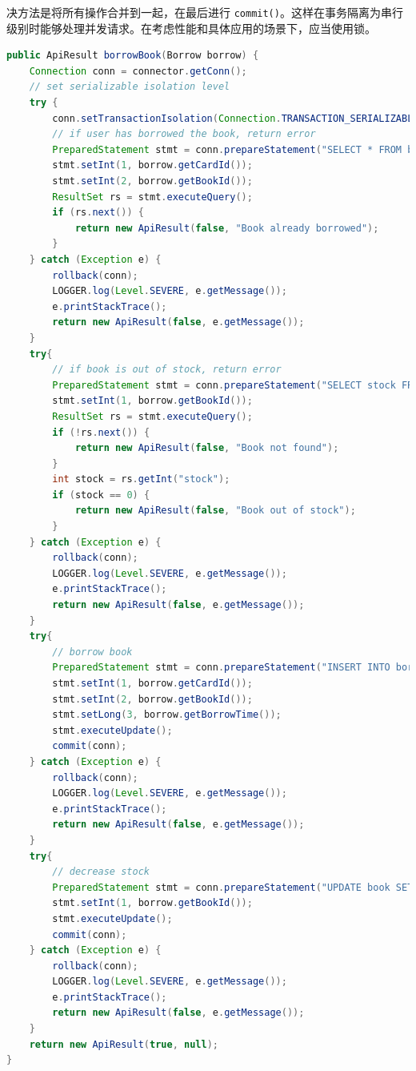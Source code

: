 \documentclass[a4paper,oneside]{ctexbook}
\begin{document}
决方法是将所有操作合并到一起，在最后进行 \verb|commit()|。这样在事务隔离为串行级别时能够处理并发请求。在考虑性能和具体应用的场景下，应当使用锁。

\begin{lstlisting}[language=java, caption=Q1,label=lst:q1]
public ApiResult borrowBook(Borrow borrow) {
    Connection conn = connector.getConn();
    // set serializable isolation level
    try {
        conn.setTransactionIsolation(Connection.TRANSACTION_SERIALIZABLE);
        // if user has borrowed the book, return error
        PreparedStatement stmt = conn.prepareStatement("SELECT * FROM borrow WHERE card_id = ? AND book_id = ? AND return_time = 0");
        stmt.setInt(1, borrow.getCardId());
        stmt.setInt(2, borrow.getBookId());
        ResultSet rs = stmt.executeQuery();
        if (rs.next()) {
            return new ApiResult(false, "Book already borrowed");
        }
    } catch (Exception e) {
        rollback(conn);
        LOGGER.log(Level.SEVERE, e.getMessage());
        e.printStackTrace();
        return new ApiResult(false, e.getMessage());
    }
    try{
        // if book is out of stock, return error
        PreparedStatement stmt = conn.prepareStatement("SELECT stock FROM book WHERE book_id = ?");
        stmt.setInt(1, borrow.getBookId());
        ResultSet rs = stmt.executeQuery();
        if (!rs.next()) {
            return new ApiResult(false, "Book not found");
        }
        int stock = rs.getInt("stock");
        if (stock == 0) {
            return new ApiResult(false, "Book out of stock");
        }
    } catch (Exception e) {
        rollback(conn);
        LOGGER.log(Level.SEVERE, e.getMessage());
        e.printStackTrace();
        return new ApiResult(false, e.getMessage());
    }
    try{
        // borrow book
        PreparedStatement stmt = conn.prepareStatement("INSERT INTO borrow (card_id, book_id, borrow_time) VALUES (?, ?, ?)");
        stmt.setInt(1, borrow.getCardId());
        stmt.setInt(2, borrow.getBookId());
        stmt.setLong(3, borrow.getBorrowTime());
        stmt.executeUpdate();
        commit(conn);
    } catch (Exception e) {
        rollback(conn);
        LOGGER.log(Level.SEVERE, e.getMessage());
        e.printStackTrace();
        return new ApiResult(false, e.getMessage());
    }
    try{
        // decrease stock
        PreparedStatement stmt = conn.prepareStatement("UPDATE book SET stock = stock - 1 WHERE book_id = ?");
        stmt.setInt(1, borrow.getBookId());
        stmt.executeUpdate();
        commit(conn);
    } catch (Exception e) {
        rollback(conn);
        LOGGER.log(Level.SEVERE, e.getMessage());
        e.printStackTrace();
        return new ApiResult(false, e.getMessage());
    }
    return new ApiResult(true, null);
}
\end{lstlisting}
\end{document}
